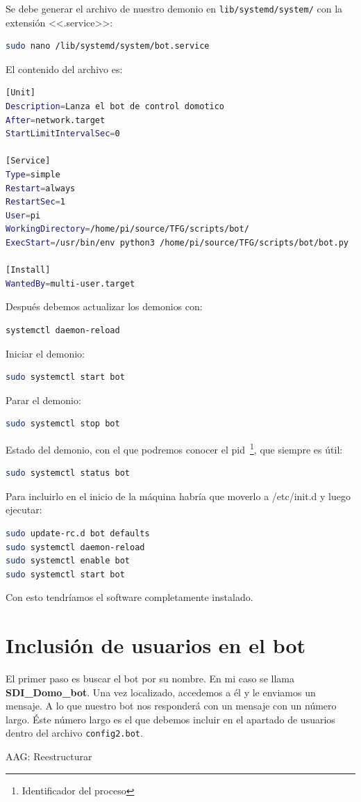 Se debe generar el archivo de nuestro demonio en \texttt{lib/systemd/system/} con la extensión <<.service>>:
\begin{lstlisting}[language=sh, firstnumber=0]
sudo nano /lib/systemd/system/bot.service
\end{lstlisting}
El contenido del archivo es:
\begin{lstlisting}[language=sh, caption={Modificaciones en el archivo /lib/systemd/system/bot.service.}, firstnumber=0]
[Unit]
Description=Lanza el bot de control domotico
After=network.target
StartLimitIntervalSec=0

[Service]
Type=simple
Restart=always
RestartSec=1
User=pi
WorkingDirectory=/home/pi/source/TFG/scripts/bot/
ExecStart=/usr/bin/env python3 /home/pi/source/TFG/scripts/bot/bot.py

[Install]
WantedBy=multi-user.target
\end{lstlisting}
Después debemos actualizar los demonios con: 
\begin{lstlisting}[language=sh, firstnumber=0]
systemctl daemon-reload
\end{lstlisting}
Iniciar el demonio: 
\begin{lstlisting}[language=sh, firstnumber=0]
sudo systemctl start bot
\end{lstlisting}
Parar el demonio: 
\begin{lstlisting}[language=sh, firstnumber=0]
sudo systemctl stop bot
\end{lstlisting}
Estado del demonio, con el que podremos conocer el pid~\footnote{Identificador del proceso}, que siempre es útil: 
\begin{lstlisting}[language=sh, firstnumber=0]
sudo systemctl status bot
\end{lstlisting}

Para incluirlo en el inicio de la máquina habría que moverlo a /etc/init.d y luego ejecutar: 
\begin{lstlisting}[language=sh, firstnumber=0]    
sudo update-rc.d bot defaults
sudo systemctl daemon-reload
sudo systemctl enable bot
sudo systemctl start bot
\end{lstlisting}  

Con esto tendríamos el software completamente instalado.

\section{Inclusión de usuarios en el bot}
El primer paso es buscar el bot por su nombre. En mi caso se llama \textbf{SDI\_Domo\_bot}.
Una vez localizado, accedemos a él y le enviamos un mensaje. A lo que nuestro bot nos responderá con un mensaje con un número largo. Éste número largo es el que debemos incluir en el apartado de usuarios dentro del archivo \texttt{config2.bot}.

AAG: Reestructurar
